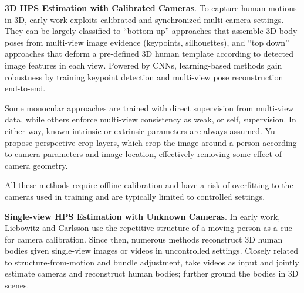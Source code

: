 \documentclass[10pt,twocolumn,letterpaper,usenames,dvipsnames]{article}
\begin{document}
\noindent\textbf{3D HPS Estimation with Calibrated Cameras}.
To capture human motions in 3D, early work exploits calibrated and synchronized multi-camera settings.
They can be largely classified to ``bottom up'' approaches \cite{belagiannis20143d,burenius20133d,dong2019fast,grauman2003inferring,sigal2008combined,zhang20204d} 
that assemble 3D body poses from multi-view image evidence (keypoints, silhouettes),
and ``top down'' approaches \cite{Balan:CVPR:2007,EEJTP15,gall2009motion,huang2017pami,totalcapture,vlasic2008articulated} 
that deform a pre-defined 3D human template according to detected image features in each view.
Powered by CNNs, learning-based methods \cite{epipolartransformers2020cvpr,iskakov2019learnable,qiu2019crossview,remelli2020lightweight,to2020voxelpose} gain robustness by training keypoint detection and multi-view pose reconstruction end-to-end. 

Some monocular approaches \cite{mpiiinf3dhp_mono-2017,Mehta2018XNectRM,Pavlakos_2017_CVPR,shen2020multi} are trained with direct supervision from multi-view data, while others \cite{deepcap,iqbal2020cvpr,kocabas2019epipolar, rhodin2018learning} enforce multi-view consistency as weak, or self, supervision. 
In either way, known intrinsic or extrinsic parameters are always assumed.
Yu \etal~\cite{yu2020pcls} propose perspective crop layers, which crop the image around a person according to camera parameters and image location, effectively removing some effect of camera geometry.

All these methods require offline calibration and have a risk of overfitting to the cameras used in training and are typically limited to controlled settings.

\noindent\textbf{Single-view HPS Estimation with Unknown Cameras}.
In early work, Liebowitz and Carlsson \cite{Liebowitz:2001} use the repetitive structure of a moving person as a cue for camera calibration.
Since then, numerous methods reconstruct 3D human bodies given single-view images or videos in uncontrolled settings.
Closely related to structure-from-motion and bundle adjustment, \cite{arnab_kineticspose,dong2020motion,leroy2020smply,xiang2020monoclothcap} take videos as input 
and jointly estimate cameras and reconstruct human bodies;
\cite{hasler2009markerless, liu20204d} further ground the bodies in 3D scenes. 
\end{document}
